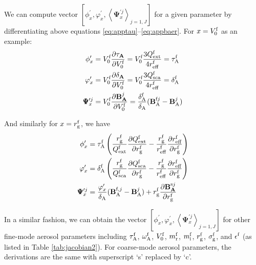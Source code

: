 We can compute vector 
$\left[ \phi_x^\prime, \varphi_x^\prime, \left<\pmb{\Psi}_x^{\prime j}\right>_{j=1,J}\right]$
for a given parameter by differentiating above equations
\eqref{eq:apptau}--\eqref{eq:appbaer}. For $x=V_0^\text{f}$ as an example:
\begingroup
\allowdisplaybreaks
\begin{align}
\phi_x^\prime &= V_0^\text{f}\frac{\partial\tau_\mathbf{A}}{\partial{V_0^\text{f}}}
               = V_0^\text{f}\frac{3Q_\text{ext}^\text{f}}{4r_\text{eff}^\text{f}}=\tau_\text{A}^\text{f} \\
\varphi_x^\prime &= V_0^\text{f}\frac{\partial\delta_\mathbf{A}}{\partial{V_0^\text{f}}}
                  = V_0^\text{f}\frac{3Q_\text{sca}^\text{f}}{4r_\text{eff}^\text{f}}=\delta_\text{A}^\text{f} \\
\pmb{\Psi}_x^{\prime j} 
           &= V_0^\text{f}\frac{\partial\mathbf{B}_\mathbf{A}^j}{\partial{V_0^\text{f}}} 
            = \frac{\delta_\text{A}^\text{f}}{\delta_\text{A}}(\mathbf{B}_\text{A}^{\text{f}j}-\mathbf{B}_\text{A}^j)  
\end{align}
\endgroup

And similarly for $x=r_\text{g}^\text{f}$, we have 
\begingroup
\allowdisplaybreaks
\begin{align}
\phi_x^\prime &= \tau_\text{A}^\text{f} 
      \left(\frac{r_\text{g}^\text{f}}{Q_\text{ext}^\text{f}}\frac{\partial Q_\text{ext}^\text{f}}{\partial r_\text{g}^\text{f}}
           -\frac{r_\text{g}^\text{f}}{r_\text{eff}^\text{f}}\frac{\partial r_\text{eff}^\text{f}}{\partial r_\text{g}^\text{f}}\right) \\
\varphi_x^\prime &= \delta_\text{A}^\text{f}
      \left(\frac{r_\text{g}^\text{f}}{Q_\text{sca}^\text{f}}\frac{\partial Q_\text{sca}^\text{f}}{\partial r_\text{g}^\text{f}}
           -\frac{r_\text{g}^\text{f}}{r_\text{eff}^\text{f}}\frac{\partial r_\text{eff}^\text{f}}{\partial r_\text{g}^\text{f}}\right) \\
\pmb{\Psi}_x^{\prime j}  
           &= \frac{\varphi_x^\prime}{\delta_\text{A}}(\mathbf{B}_\text{A}^{\text{f},j}-\mathbf{B}_\text{A}^j)
            + r_\text{g}^\text{f}\frac{\partial\mathbf{B}_\mathbf{A}^{\text{s}j}}{\partial r_\text{g}^\text{f}}
\end{align}
\endgroup

In a similar fashion, we can obtain the vector 
$\left[ \phi_x^\prime, \varphi_x^\prime, \left<\pmb{\Psi}_x^{\prime j}\right>_{j=1,J}\right]$
for other fine-mode aerosol parameters including 
$\tau_\text{A}^\text{f}$, $\omega_\text{A}^\text{f}$, $V_0^\text{f}$, $m_\text{r}^\text{f}$, $m_\text{i}^\text{f}$, 
$r_\text{g}^\text{f}$, $\sigma_\text{g}^\text{f}$, and $\epsilon^\text{f}$ (as listed in Table
\ref{tab:jacobian2}). For coarse-mode aerosol parameters, the derivations are
the same with superscript ‘s’ replaced by ‘c’.

